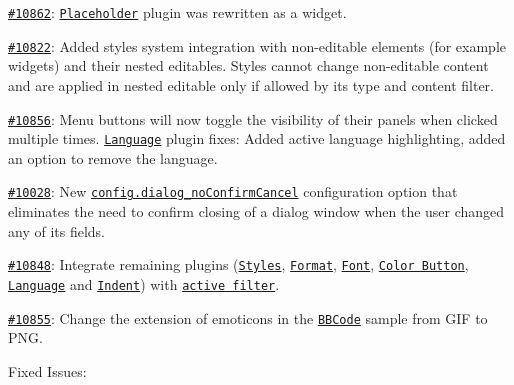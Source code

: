 {\begin{DoxyItemize}
\item \href{http://dev.ckeditor.com/ticket/10862}{\tt \#10862}\+: \href{http://ckeditor.com/addon/placeholder}{\tt Placeholder} plugin was rewritten as a widget.
\item \href{http://dev.ckeditor.com/ticket/10822}{\tt \#10822}\+: Added styles system integration with non-\/editable elements (for example widgets) and their nested editables. Styles cannot change non-\/editable content and are applied in nested editable only if allowed by its type and content filter.
\item \href{http://dev.ckeditor.com/ticket/10856}{\tt \#10856}\+: Menu buttons will now toggle the visibility of their panels when clicked multiple times. \href{http://ckeditor.com/addon/language}{\tt Language} plugin fixes\+: Added active language highlighting, added an option to remove the language.
\item \href{http://dev.ckeditor.com/ticket/10028}{\tt \#10028}\+: New \href{http://docs.ckeditor.com/#!/api/CKEDITOR.config-cfg-dialog_noConfirmCancel}{\tt {\ttfamily config.\+dialog\+\_\+no\+Confirm\+Cancel}} configuration option that eliminates the need to confirm closing of a dialog window when the user changed any of its fields.
\item \href{http://dev.ckeditor.com/ticket/10848}{\tt \#10848}\+: Integrate remaining plugins (\href{http://ckeditor.com/addon/stylescombo}{\tt Styles}, \href{http://ckeditor.com/addon/format}{\tt Format}, \href{http://ckeditor.com/addon/font}{\tt Font}, \href{http://ckeditor.com/addon/colorbutton}{\tt Color Button}, \href{http://ckeditor.com/addon/language}{\tt Language} and \href{http://ckeditor.com/addon/indent}{\tt Indent}) with \href{http://docs.ckeditor.com/#!/api/CKEDITOR.editor-property-activeFilter}{\tt active filter}.
\item \href{http://dev.ckeditor.com/ticket/10855}{\tt \#10855}\+: Change the extension of emoticons in the \href{http://ckeditor.com/addon/bbcode}{\tt B\+B\+Code} sample from G\+IF to P\+NG.
\end{DoxyItemize}}

{\ttfamily Fixed Issues\+:}

